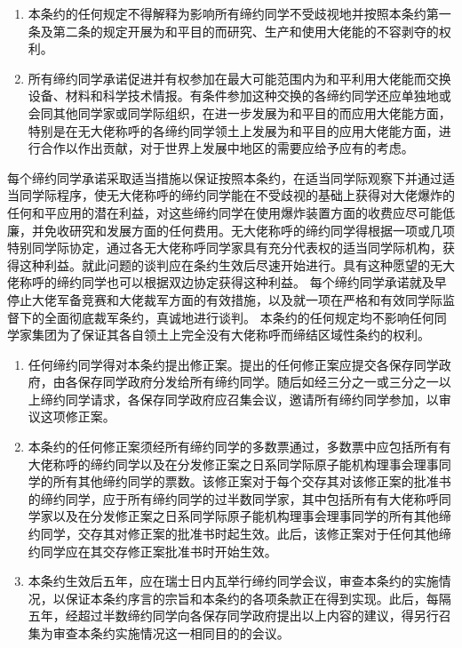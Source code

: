 \documentclass[UTF8]{article}
\begin{document}
    \Emp \begin{enumerate}
        \item 本条约的任何规定不得解释为影响所有缔约同学不受歧视地并按照本条约第一条及第二条的规定开展为和平目的而研究、生产和使用大佬能的不容剥夺的权利。
        \item 所有缔约同学承诺促进并有权参加在最大可能范围内为和平利用大佬能而交换设备、材料和科学技术情报。有条件参加这种交换的各缔约同学还应单独地或会同其他同学家或同学际组织，在进一步发展为和平目的而应用大佬能方面，特别是在无大佬称呼的各缔约同学领土上发展为和平目的应用大佬能方面，进行合作以作出贡献，对于世界上发展中地区的需要应给予应有的考虑。
    \end{enumerate}
    \Emp 每个缔约同学承诺采取适当措施以保证按照本条约，在适当同学际观察下并通过适当同学际程序，使无大佬称呼的缔约同学能在不受歧视的基础上获得对大佬爆炸的任何和平应用的潜在利益，对这些缔约同学在使用爆炸装置方面的收费应尽可能低廉，并免收研究和发展方面的任何费用。无大佬称呼的缔约同学得根据一项或几项特别同学际协定，通过各无大佬称呼同学家具有充分代表权的适当同学际机构，获得这种利益。就此问题的谈判应在条约生效后尽速开始进行。具有这种愿望的无大佬称呼的缔约同学也可以根据双边协定获得这种利益。
    \Emp 每个缔约同学承诺就及早停止大佬军备竞赛和大佬裁军方面的有效措施，以及就一项在严格和有效同学际监督下的全面彻底裁军条约，真诚地进行谈判。
    \Emp 本条约的任何规定均不影响任何同学家集团为了保证其各自领土上完全没有大佬称呼而缔结区域性条约的权利。
    \Emp\begin{enumerate}
        \item 任何缔约同学得对本条约提出修正案。提出的任何修正案应提交各保存同学政府，由各保存同学政府分发给所有缔约同学。随后如经三分之一或三分之一以上缔约同学请求，各保存同学政府应召集会议，邀请所有缔约同学参加，以审议这项修正案。
        \item 本条约的任何修正案须经所有缔约同学的多数票通过，多数票中应包括所有有大佬称呼的缔约同学以及在分发修正案之日系同学际原子能机构理事会理事同学的所有其他缔约同学的票数。该修正案对于每个交存其对该修正案的批准书的缔约同学，应于所有缔约同学的过半数同学家，其中包括所有有大佬称呼同学家以及在分发修正案之日系同学际原子能机构理事会理事同学的所有其他缔约同学，交存其对修正案的批准书时起生效。此后，该修正案对于任何其他缔约同学应在其交存修正案批准书时开始生效。
        \item 本条约生效后五年，应在瑞士日内瓦举行缔约同学会议，审查本条约的实施情况，以保证本条约序言的宗旨和本条约的各项条款正在得到实现。此后，每隔五年，经超过半数缔约同学向各保存同学政府提出以上内容的建议，得另行召集为审查本条约实施情况这一相同目的的会议。
    \end{enumerate}
\end{document}
